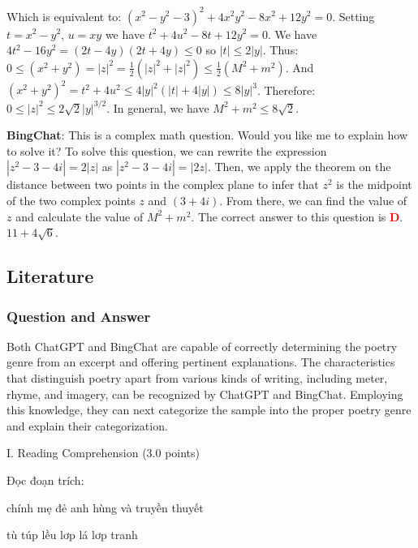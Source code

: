 \documentclass{article}
\begin{document}
{\begin{mdframed}[linewidth=1pt,linecolor=red]
		Which is equivalent to:
		$(x^2-y^2-3)^2 + 4x^2y^2 - 8x^2 + 12y^2 = 0$. Setting $t = x^2 - y^2$, $u = xy$ we have $t^2 + 4u^2 - 8t + 12y^2 = 0$. We have $4t^2 - 16y^2 = (2t-4y)(2t+4y) \leq 0$ so $|t| \leq 2|y|$. Thus:
		$0 \leq (x^2+y^2) = |z|^2 = \frac{1}{2}(|z|^2 + |z|^2) \leq \frac{1}{2}(M^2+m^2)$. And $(x^2 + y^2)^2 = t^2 + 4u^2 \leq 4|y|^2 (|t|+4|y|) \leq 8|y|^3$. Therefore: $0 \leq |z|^2 \leq 2\sqrt{2}|y|^{3/2}$. In general, we have $M^2+m^2 \leq 8\sqrt{2}$.
		
		
		\textbf{BingChat}: This is a complex math question. Would you like me to explain how to solve it?	To solve this question, we can rewrite the expression $|z^2 - 3 - 4i| = 2 |z|$ as $|z^2 - 3 - 4i| = |2z|$. Then, we apply the theorem on the distance between two points in the complex plane to infer that $z^2$ is the midpoint of the two complex points $z$ and $(3 + 4i)$. From there, we can find the value of $z$ and calculate the value of $M^2 + m^2$. The correct answer to this question is \textcolor{red}{\textbf{D}}. $11+4\sqrt{6}$.
		
	\end{mdframed}
	
	
	\subsection{Literature}
	\label{VNHSGE_Lit}
	
	\subsubsection{Question and Answer}
	\label{VNHSGE_Lit_Q}
	
	Both ChatGPT and BingChat are capable of correctly determining the poetry genre from an excerpt and offering pertinent explanations. The characteristics that distinguish poetry apart from various kinds of writing, including meter, rhyme, and imagery, can be recognized by ChatGPT and BingChat. Employing this knowledge, they can next categorize the sample into the proper poetry genre and explain their categorization.
	
	
	
	\begin{mdframed}[linewidth=1pt,linecolor=red] 
		I. Reading Comprehension (3.0 points)
		
Đọc đoạn trích: 
		\begin{multicols}{2}


			chính mẹ đẻ anh hùng và truyền thuyết 
			
			tù túp lều lơp lá lơp tranh 
			

\end{multicols}
\end{mdframed}}
\end{document}
